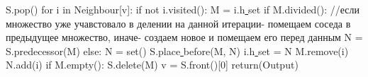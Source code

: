 \documentclass[a4paper,14pt]{article}
\begin{document}
	\newline \tab \tab \quad \quad S.pop()
	\newline \tab \tab \quad for i in Neighbour[v]:
	\newline \tab \tab \quad \quad if not i.visited():
	\newline \tab \tab \quad \quad \quad M = i.h\underline{ }set
	\newline \tab \tab \quad \quad \quad if M.divided(): //если множество уже учавстовало в делении на данной итерации- помещаем соседа в предыдущее множество, иначе- создаем новое и помещаем его перед данным
	\newline \tab \tab \quad \quad \quad \quad N = S.predecessor(M)
	\newline \tab \tab \quad \quad \quad else:
	\newline \tab \tab \quad \quad \quad \quad N = set()
	\newline \tab \tab \quad \quad \quad \quad S.place\underline{ }before(M, N) 
	\newline \tab \tab \quad \quad \quad i.h\underline{ }set = N
	\newline \tab \tab \quad \quad \quad M.remove(i)
	\newline \tab \tab \quad \quad \quad N.add(i)	
	\newline \tab \tab \quad \quad \quad if M.empty():
	\newline \tab \tab \quad \quad \quad \quad S.delete(M)
	\newline \tab \tab \quad  v = S.front()[0]
	\newline \tab \tab return(Output)
\end{document}
